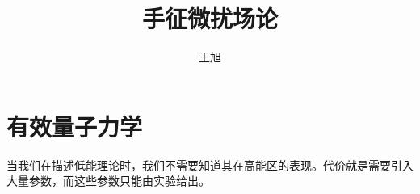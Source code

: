\documentclass[aps,tightenlines,16pt]{ctexart}
\numberwithin{equation}{section}
\begin{document}
\large
     \title{手征微扰场论}
     
\renewcommand{\today}{\number\year 年 \number\month 月 \number\day 日}
 \author{王旭}
 \maketitle
 \setlength{\parindent}{2em}  %
 \hypersetup{hypertex=true,
            colorlinks=true,
            linkcolor=blue,
            anchorcolor=blue,
            citecolor=blue}  %
 \renewcommand\thesubsection{\arabic {subsection}}
 \renewcommand\contentsname{目录}
\tableofcontents
\newpage 

\section{有效量子力学}

当我们在描述低能理论时，我们不需要知道其在高能区的表现。代价就是需要引入大量参数，而这些参数只能由实验给出。







    
\newpage 

\renewcommand\refname{参考文献}




\end{document}
